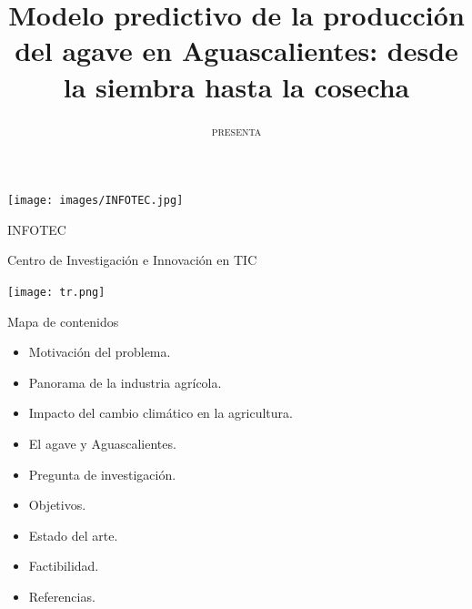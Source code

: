 \documentclass[aspectratio=169]{beamer}
\title[]{\Large\centering
\color{airforceblue}Modelo predictivo de la producción del agave en Aguascalientes: desde la siembra hasta la cosecha}
\author{{\small \textsc{presenta}}\centering{\\Isaac Vázquez Mendoza \\ {\small\textsc{
		bajo la dirección de}}\\ Dra. Magali Arellano Vázquez}}
\institute{}
\begin{document}
	\begin{frame}[noframenumbering]
		
		\begin{minipage}{0.15\textwidth}
			\centering
			\hspace{0.3cm}\vspace{-0.6cm}\texttt{[image: images/INFOTEC.jpg]}
		\end{minipage}%
		\begin{minipage}{0.65\textwidth}
			\centering \vspace{0.5cm}
			\hspace{1cm}INFOTEC
			
			\hspace{1cm}Centro de Investigación e Innovación en TIC
                \hspace{1cm}
   
		\end{minipage}%
		\begin{minipage}{0.2\textwidth}
			\texttt{[image: tr.png]}
                \hspace*{0.5cm}%
		\end{minipage}
		\date{}
		\titlepage
		
		
		
	\end{frame}
%
%


%
%



{
	\begin{frame}{Mapa de contenidos}
		\vspace{-1cm}\begin{itemize}
			\color{airforceblue}
			\item Motivación del problema.
			\item Panorama de la industria agrícola.
			\item Impacto del cambio climático en la agricultura.
			\item El agave y Aguascalientes.
			\item Pregunta de investigación.
			\item Objetivos.
			\item Estado del arte.
			\item Factibilidad.
			\item Referencias.
		\end{itemize}
	\end{frame}
}
\end{document}
